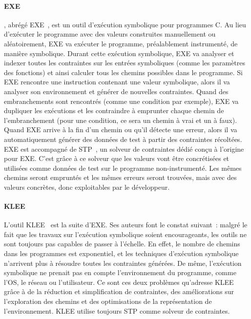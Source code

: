 \paragraph{EXE} , abrégé
EXE~, est un outil d'exécution symbolique pour
programmes C. Au lieu d'exécuter le programme avec des valeurs construites
manuellement ou aléatoirement, EXE va exécuter le programme, préalablement
instrumenté, de manière symbolique. Durant cette exécution symbolique, EXE va
analyser et indexer toutes les contraintes sur les entrées symboliques (comme
les paramètres des fonctions) et ainsi calculer tous les chemins possibles dans
le programme.  Si EXE rencontre une instruction contenant une valeur symbolique,
alors il va analyser son environnement et générer de nouvelles contraintes.
Quand des embranchements sont rencontrés (comme une condition par exemple), EXE
va dupliquer les exécutions et les contraindre à emprunter chaque chemin de
l'embranchement (pour une condition, ce sera un chemin à vrai et un à faux).
Quand EXE arrive à la fin d'un chemin ou qu'il détecte une erreur, alors il va
automatiquement générer des données de test à partir des contraintes récoltées.
EXE est accompagné de STP~, un solveur de contraintes dédié
conçu à l'origine pour EXE. C'est grâce à ce solveur que les valeurs vont être
concrétisées et utilisées comme données de test sur le programme
non-instrumenté. Les mêmes chemins seront empruntés et les mêmes erreurs seront
trouvées, mais avec des valeurs concrètes, donc exploitables par le développeur.

\paragraph{KLEE} L'outil KLEE~ est la suite d'EXE. Ses auteurs
font le constat suivant~: malgré le fait que les travaux sur l'exécution
symbolique soient encourageants, les outils ne sont toujours pas capables de
passer à l'échelle. En effet, le nombre de chemins dans les programmes est
exponentiel, et les techniques d'exécution symbolique n'arrivent plus à résoudre
toutes les contraintes générées. De même, l'exécution symbolique ne prenait pas
en compte l'environnement du programme, comme l'OS, le réseau ou l'utilisateur.
Ce sont ces deux problèmes qu'adresse KLEE grâce à de la réduction et
simplification de contraintes, des améliorations sur l'exploration des chemins
et des optimisations de la représentation de l'environnement. KLEE utilise
toujours STP comme solveur de contraintes.

